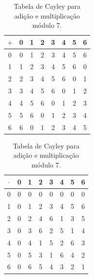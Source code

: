 \begin{example}
\begin{table}[!htb]
    \centering
    \caption{Tabela de Cayley para adição e multiplicação módulo 7.}
    \label{tab:cayley_mod7}
    \begin{minipage}{.45\linewidth}
        \centering
        \begin{tabular}{c|ccccccc}
            $+$ & 0 & 1 & 2 & 3 & 4 & 5 & 6 \\
            \hline
            0 & 0 & 1 & 2 & 3 & 4 & 5 & 6 \\
            1 & 1 & 2 & 3 & 4 & 5 & 6 & 0 \\
            2 & 2 & 3 & 4 & 5 & 6 & 0 & 1 \\
            3 & 3 & 4 & 5 & 6 & 0 & 1 & 2 \\
            4 & 4 & 5 & 6 & 0 & 1 & 2 & 3 \\
            5 & 5 & 6 & 0 & 1 & 2 & 3 & 4 \\
            6 & 6 & 0 & 1 & 2 & 3 & 4 & 5 \\
        \end{tabular}
    \end{minipage}\hfill
    \begin{minipage}{.45\linewidth}
        \centering
        \begin{tabular}{c|ccccccc}
            $\cdot$ & 0 & 1 & 2 & 3 & 4 & 5 & 6 \\
            \hline
            0 & 0 & 0 & 0 & 0 & 0 & 0 & 0 \\
            1 & 0 & 1 & 2 & 3 & 4 & 5 & 6 \\
            2 & 0 & 2 & 4 & 6 & 1 & 3 & 5 \\
            3 & 0 & 3 & 6 & 2 & 5 & 1 & 4 \\
            4 & 0 & 4 & 1 & 5 & 2 & 6 & 3 \\
            5 & 0 & 5 & 3 & 1 & 6 & 4 & 2 \\
            6 & 0 & 6 & 5 & 4 & 3 & 2 & 1 \\
        \end{tabular}
    \end{minipage}
\end{table}
\end{example}

